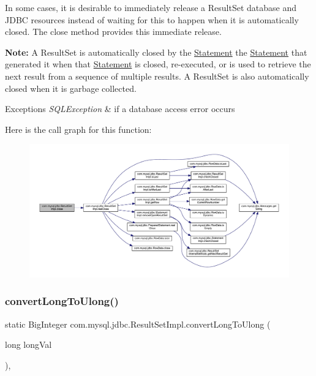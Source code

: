 In some cases, it is desirable to immediately release a Result\+Set database and J\+D\+BC resources instead of waiting for this to happen when it is automatically closed. The close method provides this immediate release.

{\bfseries Note\+:} A Result\+Set is automatically closed by the \mbox{\hyperlink{interfacecom_1_1mysql_1_1jdbc_1_1_statement}{Statement}} the \mbox{\hyperlink{interfacecom_1_1mysql_1_1jdbc_1_1_statement}{Statement}} that generated it when that \mbox{\hyperlink{interfacecom_1_1mysql_1_1jdbc_1_1_statement}{Statement}} is closed, re-\/executed, or is used to retrieve the next result from a sequence of multiple results. A Result\+Set is also automatically closed when it is garbage collected. 


\begin{DoxyExceptions}{Exceptions}
{\em S\+Q\+L\+Exception} & if a database access error occurs \\
\hline
\end{DoxyExceptions}
Here is the call graph for this function\+:
\nopagebreak
\begin{figure}[H]
\begin{center}
\leavevmode
\includegraphics[width=350pt]{classcom_1_1mysql_1_1jdbc_1_1_result_set_impl_a08b7641e8a768554093538fc9c0a4143_cgraph}
\end{center}
\end{figure}
\mbox{\label{classcom_1_1mysql_1_1jdbc_1_1_result_set_impl_a16e3f459e97906fb255efd74d2ee34c1}} 
\subsubsection{\texorpdfstring{convert\+Long\+To\+Ulong()}{convertLongToUlong()}}
{\footnotesize\ttfamily static Big\+Integer com.\+mysql.\+jdbc.\+Result\+Set\+Impl.\+convert\+Long\+To\+Ulong (\begin{DoxyParamCaption}\item[{long}]{long\+Val }\end{DoxyParamCaption})\hspace{0.3cm}{\ttfamily [static]}, {\ttfamily [protected]}}

